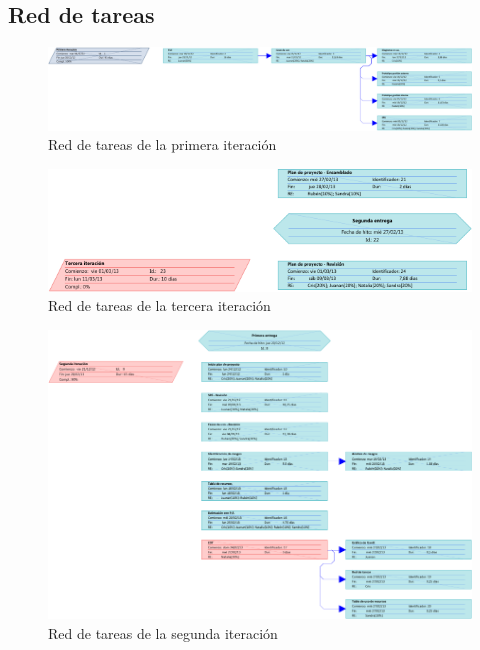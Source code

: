 \documentclass[11pt, a4paper, twoside, titlepage]{article}
\begin{document}
		\begin{landscape}
		\subsection{Red de tareas}
			\begin{figure}[h] \centering
			\vspace{1.1cm}
			\includegraphics[scale=1]{planific/redtareas1.pdf}
			\caption{Red de tareas de la primera iteración}
			\end{figure}

			\begin{figure}[h] \centering
			\vspace{1.1cm}
			\includegraphics[scale=1.2]{planific/redtareas3.pdf}
			\caption{Red de tareas de la tercera iteración}
			\end{figure}

			\begin{figure}[h] \centering
			\includegraphics[scale=1.45]{planific/redtareas2.pdf}
			\caption{Red de tareas de la segunda iteración}
			\end{figure}
		\end{landscape}
\end{document}
